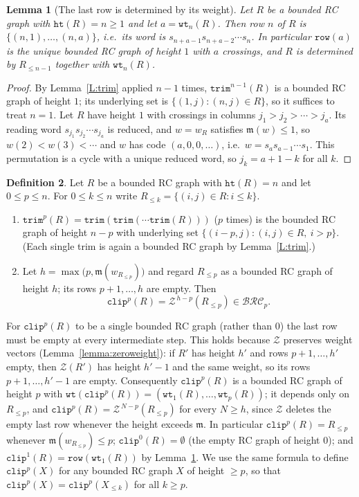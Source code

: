 \documentclass{amsart}
\newtheorem{lemma}{Lemma}[subsection]
\theoremstyle{definition}
\newtheorem{definition}[lemma]{Definition}
\theoremstyle{remark}
\numberwithin{equation}{subsection}
\newcommand{\wof}[1]{w_{#1}}
\newcommand{\wtt}{\mathtt{wt}}
\newcommand{\trm}{\mathtt{trim}}
\newcommand{\zeromap}{\mathcal{Z}}
\newcommand{\hr}{\mathtt{ht}}
\newcommand{\clp}{\mathtt{clip}}
\newcommand{\BRC}{\mathcal{BRC}}
\newcommand{\maxd}{\mathfrak{m}}
\begin{document}
\begin{lemma}[The last row is determined by its weight]\label{lemma:lastrow}
Let $R$ be a bounded RC graph with $\hr(R)=n\geq 1$ and let $a=\wtt_n(R)$. Then row $n$ of $R$ is $\{(n,1),\ldots,(n,a)\}$, i.e.\ its word is $s_{n+a-1}s_{n+a-2}\cdots s_n$. In particular $\mathtt{row}(a)$ is the unique bounded RC graph of height $1$ with $a$ crossings, and $R$ is determined by $R_{\leq n-1}$ together with $\wtt_n(R)$.
\end{lemma}
\begin{proof}
By Lemma~\ref{L:trim} applied $n-1$ times, $\trm^{n-1}(R)$ is a bounded RC graph of height $1$; its underlying set is $\{(1,j):(n,j)\in R\}$, so it suffices to treat $n=1$. Let $R$ have height $1$ with crossings in columns $j_1>j_2>\cdots>j_a$. Its reading word $s_{j_1}s_{j_2}\cdots s_{j_a}$ is reduced, and $w=\wof{R}$ satisfies $\maxd(w)\leq 1$, so $w(2)<w(3)<\cdots$ and $w$ has code $(a,0,0,\ldots)$, i.e.\ $w=s_a s_{a-1}\cdots s_1$. This permutation is a cycle with a unique reduced word, so $j_k=a+1-k$ for all $k$.
\end{proof}

\begin{definition}\label{definition:cliptrim}
Let $R$ be a bounded RC graph with $\hr(R)=n$ and let $0\leq p\leq n$. For $0\leq k\leq n$ write $R_{\leq k}=\{(i,j)\in R: i\leq k\}$.
\begin{enumerate}
\item $\trm^p(R)=\trm(\trm(\cdots\trm(R)))$ ($p$ times) is the bounded RC graph of height $n-p$ with underlying set $\{(i-p,j):(i,j)\in R,\ i>p\}$. (Each single trim is again a bounded RC graph by Lemma~\ref{L:trim}.)
\item Let $h=\max\bigl(p,\maxd(\wof{R_{\leq p}})\bigr)$ and regard $R_{\leq p}$ as a bounded RC graph of height $h$; its rows $p+1,\ldots,h$ are empty. Then
$$\clp^p(R)=\zeromap^{\,h-p}(R_{\leq p})\in\BRC_p\text{.}$$
\end{enumerate}
\end{definition}

For $\clp^p(R)$ to be a single bounded RC graph (rather than $0$) the last row must be empty at every intermediate step. This holds because $\zeromap$ preserves weight vectors (Lemma~\ref{lemma:zeroweight}): if $R'$ has height $h'$ and rows $p+1,\ldots,h'$ empty, then $\zeromap(R')$ has height $h'-1$ and the same weight, so its rows $p+1,\ldots,h'-1$ are empty. Consequently $\clp^p(R)$ is a bounded RC graph of height $p$ with $\wtt(\clp^p(R))=(\wtt_1(R),\ldots,\wtt_p(R))$; it depends only on $R_{\leq p}$, and $\clp^p(R)=\zeromap^{\,N-p}(R_{\leq p})$ for every $N\geq h$, since $\zeromap$ deletes the empty last row whenever the height exceeds $\maxd$. In particular $\clp^p(R)=R_{\leq p}$ whenever $\maxd(\wof{R_{\leq p}})\leq p$; $\clp^0(R)=\emptyset$ (the empty RC graph of height $0$); and $\clp^1(R)=\mathtt{row}(\wtt_1(R))$ by Lemma~\ref{lemma:lastrow}. We use the same formula to define $\clp^p(X)$ for any bounded RC graph $X$ of height $\geq p$, so that $\clp^p(X)=\clp^p(X_{\leq k})$ for all $k\geq p$.
\end{document}
